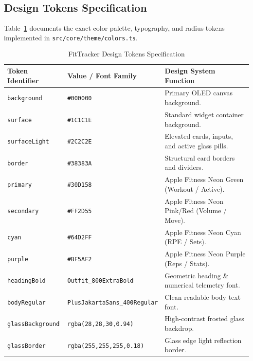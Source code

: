 \subsection{Design Tokens Specification}
Table~\ref{tab:design_tokens} documents the exact color palette, typography, and radius tokens implemented in \texttt{src/core/theme/colors.ts}.

\begin{table}[h!]
\centering
\caption{FitTracker Design Tokens Specification}
\label{tab:design_tokens}
\begin{tabularx}{\textwidth}{l l X}
\toprule
\textbf{Token Identifier} & \textbf{Value / Font Family} & \textbf{Design System Function} \\
\midrule
\texttt{background} & \texttt{\#000000} & Primary OLED canvas background. \\
\texttt{surface} & \texttt{\#1C1C1E} & Standard widget container background. \\
\texttt{surfaceLight} & \texttt{\#2C2C2E} & Elevated cards, inputs, and active glass pills. \\
\texttt{border} & \texttt{\#38383A} & Structural card borders and dividers. \\
\texttt{primary} & \texttt{\#30D158} & Apple Fitness Neon Green (Workout / Active). \\
\texttt{secondary} & \texttt{\#FF2D55} & Apple Fitness Neon Pink/Red (Volume / Move). \\
\texttt{cyan} & \texttt{\#64D2FF} & Apple Fitness Neon Cyan (RPE / Sets). \\
\texttt{purple} & \texttt{\#BF5AF2} & Apple Fitness Neon Purple (Reps / Stats). \\
\texttt{headingBold} & \texttt{Outfit\_800ExtraBold} & Geometric heading \& numerical telemetry font. \\
\texttt{bodyRegular} & \texttt{PlusJakartaSans\_400Regular} & Clean readable body text font. \\
\texttt{glassBackground} & \texttt{rgba(28,28,30,0.94)} & High-contrast frosted glass backdrop. \\
\texttt{glassBorder} & \texttt{rgba(255,255,255,0.18)} & Glass edge light reflection border. \\
\bottomrule
\end{tabularx}
\end{table}

